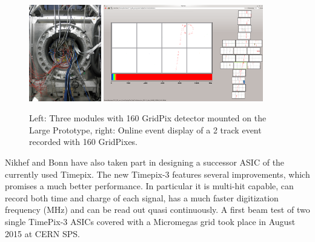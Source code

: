 \begin{figure}[!t]
  \centering
  \includegraphics[width=0.28\textwidth]{Tracker/TPC_Bonn/plots/TPC_pixels_LP_GridPixes.png}
  \includegraphics[width=0.62\textwidth]{Tracker/TPC_Bonn/plots/TPC_pixels_event.png}
  \caption{Left: Three modules with 160 GridPix detector mounted on the Large
    Prototype, right: Online event display of a 2 track event recorded with
    160 GridPixes.}
  \label{fig_TPC_pixels_2}
\end{figure}

Nikhef and Bonn have also taken part in designing a successor ASIC of
the currently used Timepix. The new Timepix-3 features several improvements,
which promises a much better performance. In particular it is multi-hit capable,
can record both time and charge of each signal, has a much faster
digitization frequency (\unit[640]{MHz}) and can be read out  quasi continuously.
A first beam test of two single TimePix-3 ASICs covered with a Micromegas
grid took place in August 2015 at CERN SPS.


